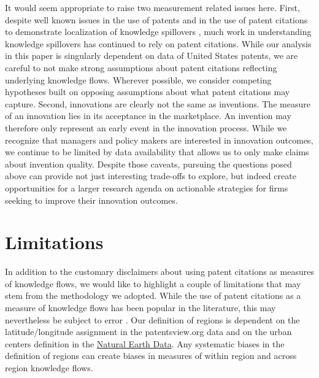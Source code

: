\documentclass[12pt,letterpaper]{article}
\begin{document}
It would seem appropriate to raise two measurement related issues here. First, despite well known issues in the use of patents \citep{Griliches1990, Scherer1984} and in the use of patent citations to demonstrate localization of knowledge spillovers \citep*{Thompson2005, Arora2017a}, much work in understanding knowledge spillovers has continued to rely on patent citations. While our analysis in this paper is singularly dependent on data of United States patents, we are careful to not make strong assumptions about patent citations reflecting underlying knowledge flows. Wherever possible, we consider competing hypotheses built on opposing assumptions about what patent citations may capture. Second, innovations are clearly not the same as inventions. The measure of an innovation lies in its acceptance in the marketplace. An invention may therefore only represent an early event in the innovation process. While we recognize that managers and policy makers are interested in innovation outcomes, we continue to be limited by data availability that allows us to only make claims about invention quality. Despite those caveats, pursuing the questions posed above can provide not just interesting trade-offs to explore, but indeed create opportunities for a larger research agenda on actionable strategies for firms seeking to improve their innovation outcomes.\par


\section*{Limitations}
In addition to the customary disclaimers about using patent citations as measures of knowledge flows, we would like to highlight a couple of limitations that may stem from the methodology we adopted. While the use of patent citations as a measure of knowledge flows has been popular in the literature, this may nevertheless be subject to error \citep*{Arora2017a}. Our definition of regions is dependent on the latitude/longitude assignment in the patentsview.org data and on the urban centers definition in the \href{http://www.naturalearthdata.com/downloads/10m-cultural-vectors/}{Natural Earth Data}. Any systematic biases in the definition of regions can create biases in measures of within region and across region knowledge flows. \par
\end{document}
